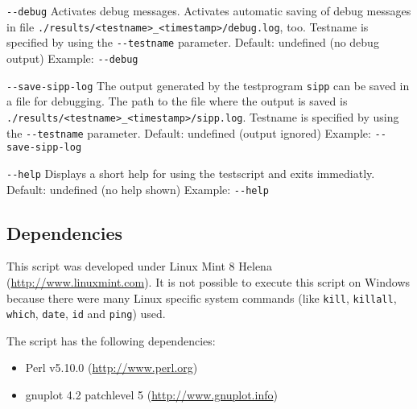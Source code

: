 \begin{description}
\item {\texttt{-{}-debug}} \newline
Activates debug messages. Activates automatic saving of debug messages
in file \texttt{./results/<testname>\_<timestamp>/debug.log}, too.
Testname is specified by using the \texttt{-{}-testname} parameter.
\newline Default: undefined (no debug output)
\newline Example: \texttt{-{}-debug}

\item {\texttt{-{}-save-sipp-log}} \newline
The output generated by the testprogram \texttt{sipp} can be saved in a file for debugging.
The path to the file where the output is saved is
\texttt{./results/<testname>\_<timestamp>/sipp.log}.
Testname is specified by using the \texttt{-{}-testname} parameter.
\newline Default: undefined (output ignored)
\newline Example: \texttt{-{}-save-sipp-log}

\item {\texttt{-{}-help}} \newline
Displays a short help for using the testscript and exits immediatly.
\newline Default: undefined (no help shown)
\newline Example: \texttt{-{}-help}

\end{description}
\subsection{Dependencies}%
This script was developed under Linux Mint 8 Helena (\url{http://www.linuxmint.com}).
It is not possible to execute this script on Windows because there were many Linux specific system commands
(like \texttt{kill}, \texttt{killall}, \texttt{which}, \texttt{date}, \texttt{id} and \texttt{ping}) used.

The script has the following dependencies:
\begin{itemize}
	\item Perl v5.10.0 (\url{http://www.perl.org})
	\item gnuplot 4.2 patchlevel 5 (\url{http://www.gnuplot.info})
\end{itemize}
